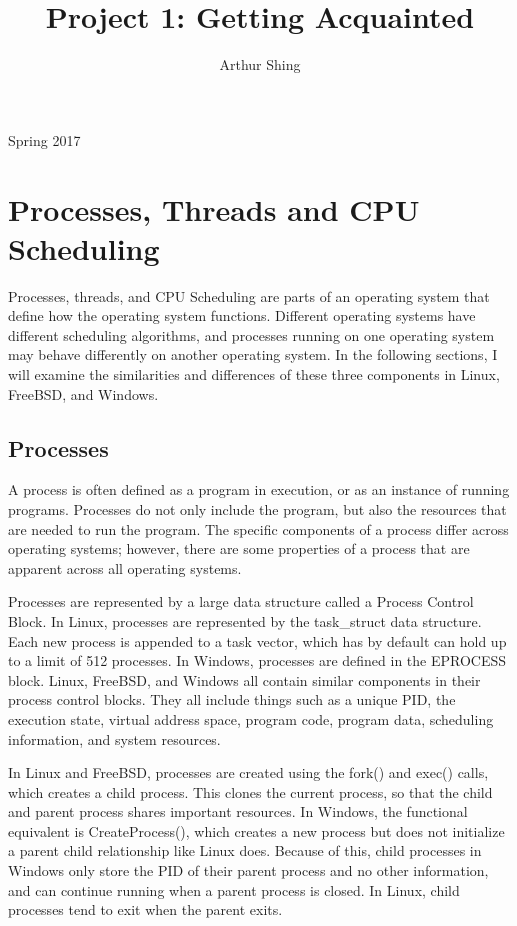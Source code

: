 \documentclass[journal, letterpaper, draftclsnofoot, onecolumn, 10pt]{journal}
\begin{document}
\title{Project 1: Getting Acquainted}
\author{Arthur Shing}


\begin{titlepage}
    \centering
    \maketitle
    \large Spring 2017



\end{titlepage}
\tableofcontents
\clearpage


\section{Processes, Threads and CPU Scheduling}

Processes, threads, and CPU Scheduling are parts of an operating system that define how the operating system functions. Different operating systems have different scheduling algorithms, and processes running on one operating system may behave differently on another operating system. In the following sections, I will examine the similarities and differences of these three components in Linux, FreeBSD, and Windows.

\subsection{Processes}

A process is often defined as a program in execution, or as an instance of running programs. Processes do not only include the program, but also the resources that are needed to run the program. The specific components of a process differ across operating systems; however, there are some properties of a process that are apparent across all operating systems.

Processes are represented by a large data structure called a Process Control Block. In Linux, processes are represented by the task\_struct data structure. Each new process is appended to a task vector, which has by default can hold up to a limit of 512 processes. In Windows, processes are defined in the EPROCESS block.  Linux, FreeBSD, and Windows all contain similar components in their process control blocks. They all include things such as a unique PID, the execution state, virtual address space, program code, program data, scheduling information, and system resources.

In Linux and FreeBSD, processes are created using the fork() and exec() calls, which creates a child process. This clones the current process, so that the child and parent process shares important resources. In Windows, the functional equivalent is CreateProcess(), which creates a new process but does not initialize a parent child relationship like Linux does. Because of this, child processes in Windows only store the PID of their parent process and no other information, and can continue running when a parent process is closed. In Linux, child processes tend to exit when the parent exits.
\FloatBarrier
\end{document}
